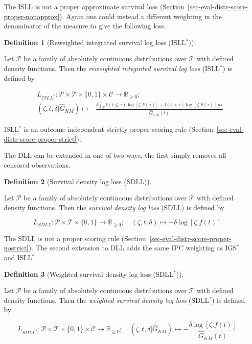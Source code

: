 \documentclass[
  letterpaper,
]{scrbook}
\theoremstyle{plain}
\theoremstyle{definition}
\newtheorem{definition}{Definition}[chapter]
\theoremstyle{remark}
\begin{document}
The ISLL is not a proper approximate survival loss
(Section~\ref{sec-eval-distr-score-proper-nonapprox}). Again one could
instead a different weighting in the denominator of the measure to give
the following loss.

\leavevmode{}%
\begin{definition}[Reweighted integrated survival log loss
(ISLL\(^*\))]\label{def-risll}

Let \(\mathcal{P}\) be a family of absolutely continuous distributions
over \(\mathcal{T}\) with defined density functions. Then the
\emph{reweighted integrated survival log loss} (ISLL\(^*\)) is defined
by

\[\label{eq:wsill}
\begin{split}
&L_{ISLL^*}: \mathcal{P}\times \mathcal{T}\times \{0,1\}\times \mathcal{C}\rightarrow \mathbb{R}_{\geq 0};\\
&(\zeta, t, \delta|\hat{G}_{KM}) \mapsto -\frac{\delta \int_{\mathcal{T}} \mathbb{I}(t \leq \tau)\log[\zeta.F(\tau)] + \mathbb{I}(t > \tau)\log[\zeta.S(\tau)] \ d\tau}{\hat{G}_{KM}(t)}
\end{split}
\]

\end{definition}

ISLL\(^*\) is an outcome-independent strictly proper scoring rule
(Section~\ref{sec-eval-distr-score-proper-strict}).

The DLL can be extended in one of two ways, the first simply removes all
censored observations.

\leavevmode{}%
\begin{definition}[Survival density log loss (SDLL)]\label{def-sdll}

Let \(\mathcal{P}\) be a family of absolutely continuous distributions
over \(\mathcal{T}\) with defined density functions. Then the
\emph{survival density log loss} (SDLL) is defined by

\[
L_{SDLL}: \mathcal{P}\times \mathcal{T}\times \{0,1\}\rightarrow \mathbb{R}_{\geq 0}; \quad (\zeta, t, \delta) \mapsto - \delta \log[\zeta.f(t)]
\label{eq:sdll}
\]

\end{definition}

The SDLL is not a proper scoring rule
(Section~\ref{sec-eval-distr-score-proper-nostrict}). The second
extension to DLL adds the same IPC weighting as IGS\(^*\) and
ISLL\(^*\).

\leavevmode{}%
\begin{definition}[Weighted survival density log loss
(SDLL\(^*\))]\label{def-wsdll}

Let \(\mathcal{P}\) be a family of absolutely continuous distributions
over \(\mathcal{T}\) with defined density functions. Then the
\emph{weighted survival density log loss} (SDLL\(^*\)) is defined by

\[\label{eq:wsdll}
L_{SDLL^*}: \mathcal{P}\times \mathcal{T}\times \{0,1\}\times \mathcal{C}\rightarrow \mathbb{R}_{\geq 0}; \quad (\zeta, t, \delta|\hat{G}_{KM}) \mapsto - \frac{\delta \log[\zeta.f(t)]}{\hat{G}_{KM}(t)}
\]

\end{definition}
\end{document}
